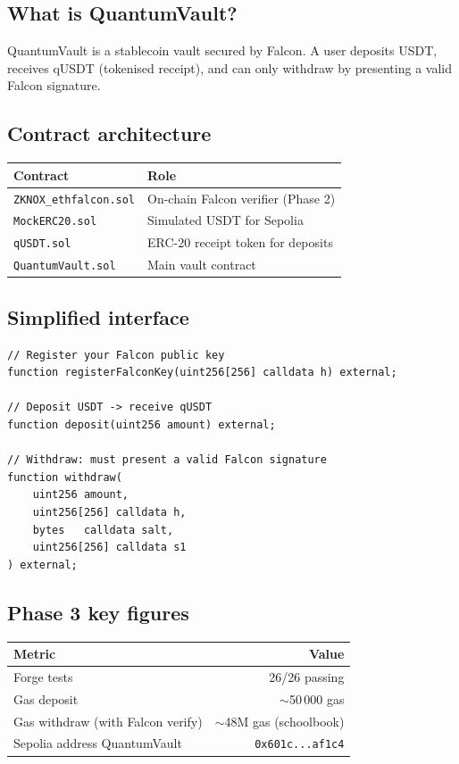 \documentclass[11pt,a4paper]{article}
\begin{document}
\subsection{What is QuantumVault?}

QuantumVault is a stablecoin vault secured by Falcon. A user deposits USDT, receives qUSDT (tokenised receipt), and can only withdraw by presenting a valid Falcon signature.

\subsection{Contract architecture}

\begin{center}
\begin{tabular}{ll}
\toprule
\textbf{Contract} & \textbf{Role} \\
\midrule
\texttt{ZKNOX\_ethfalcon.sol} & On-chain Falcon verifier (Phase 2) \\
\texttt{MockERC20.sol}        & Simulated USDT for Sepolia \\
\texttt{qUSDT.sol}            & ERC-20 receipt token for deposits \\
\texttt{QuantumVault.sol}     & Main vault contract \\
\bottomrule
\end{tabular}
\end{center}

\subsection{Simplified interface}

\begin{lstlisting}[style=solidity, caption={QuantumVault interface}]
// Register your Falcon public key
function registerFalconKey(uint256[256] calldata h) external;

// Deposit USDT -> receive qUSDT
function deposit(uint256 amount) external;

// Withdraw: must present a valid Falcon signature
function withdraw(
    uint256 amount,
    uint256[256] calldata h,
    bytes   calldata salt,
    uint256[256] calldata s1
) external;
\end{lstlisting}

\subsection{Phase 3 key figures}

\begin{center}
\begin{tabular}{lr}
\toprule
\textbf{Metric} & \textbf{Value} \\
\midrule
Forge tests & 26/26 passing \\
Gas deposit & $\sim$50\,000 gas \\
Gas withdraw (with Falcon verify) & $\sim$48M gas (schoolbook) \\
Sepolia address QuantumVault & \texttt{0x601c...af1c4} \\
\bottomrule
\end{tabular}
\end{center}
\end{document}
